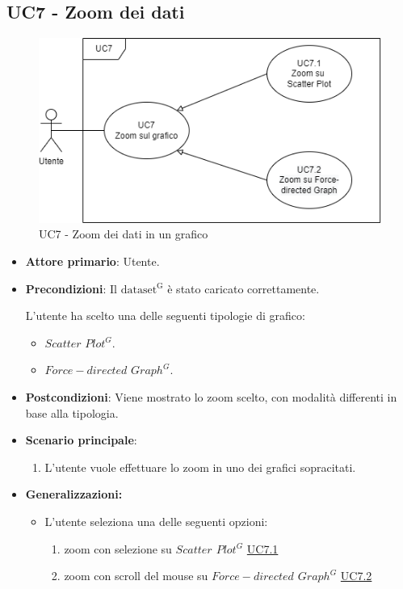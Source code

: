 \subsection{UC7 - Zoom dei dati}
\label{sec:UC7}
\begin{figure}[h!]
    \centering
    \includegraphics[scale=0.60]{../../assets/ZoomUC7.png}
    \caption{UC7 - Zoom dei dati in un grafico}
\end{figure}
\begin{itemize}
    \item \textbf{Attore primario}: Utente.
    \item \textbf{Precondizioni}: Il ${\mathrm{dataset^{G}}}$ è stato caricato correttamente. \par L'utente ha scelto una delle seguenti tipologie di grafico:
    \begin{itemize}
    		\item $Scatter$ $Plot^{G}$.
    		\item $Force-directed$ $Graph^{G}$.
    \end{itemize}
    \item \textbf{Postcondizioni}: Viene mostrato lo zoom scelto, con modalità differenti in base alla tipologia.
    \item \textbf{Scenario principale}:
          \begin{enumerate}
              \item L'utente vuole effettuare lo zoom in uno dei grafici sopracitati.
          \end{enumerate}
    \item \textbf{Generalizzazioni:}
    \begin{itemize}
        \item L'utente seleziona una delle seguenti opzioni:
                \begin{enumerate}
                    \item zoom con selezione su \textit{$Scatter$ $Plot^{G}$} \hyperref[sec:UC7.1]{UC7.1}
                    \item zoom con scroll del mouse su \textit{$Force-directed$ $Graph^{G}$} \hyperref[sec:UC7.2]{UC7.2}
                \end{enumerate}
    \end{itemize} 
\end{itemize}

